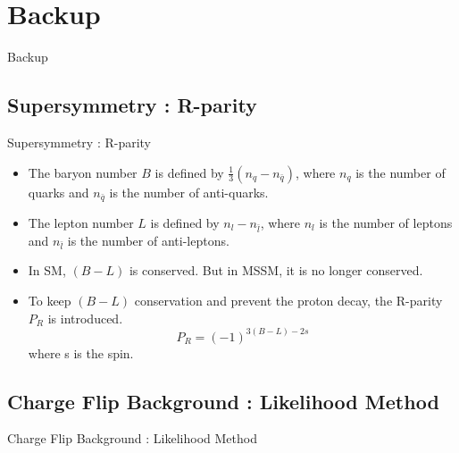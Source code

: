 \documentclass[mathserif,serif]{beamer}
\begin{document}
\section{Backup}
\begin{frame}
\begin{center}
\huge
Backup
\end{center}
\end{frame}

\subsection{Supersymmetry : R-parity}
\begin{frame}{Supersymmetry : R-parity}
\begin{itemize}
\item The baryon number $B$ is defined by $\frac{1}{3} (n_q - n_{\bar{q}})$, where $n_q$ is the number of quarks and $n_{\bar{q}}$ is the number of anti-quarks.
\item The lepton number $L$ is defined by $n_l - n_{\bar{l}}$, where $n_l$ is the number of leptons and $n_{\bar{l}}$ is the number of anti-leptons.
\item In SM, $(B-L)$ is conserved. But in MSSM, it is no longer conserved.
\item To keep $(B-L)$ conservation and prevent the proton decay, the R-parity $P_R$ is introduced.
\begin{equation*}
P_R = (-1)^{3(B-L)-2s}
\end{equation*}
where s is the spin.
\end{itemize}
\end{frame}

\subsection{Charge Flip Background : Likelihood Method}
\begin{frame}
\begin{center}
\huge
Charge Flip Background : Likelihood Method
\end{center}
\end{frame}
\end{document}
